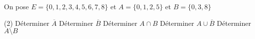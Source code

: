 %
%
On pose $E=\lbrace 0,1,2,3,4,5,6,7,8\rbrace$ et $A=\lbrace 0, 1,2,5\rbrace$ et $B=\lbrace 0,3,8\rbrace$
\begin{tasks} (2)
	\task Déterminer $\overline{A}$
	\task  Déterminer $\overline{B}$
	\task Déterminer $A\cap B$
	\task Déterminer $A\cup\overline{B}$
	\task Déterminer $A\setminus B$
\end{tasks}
